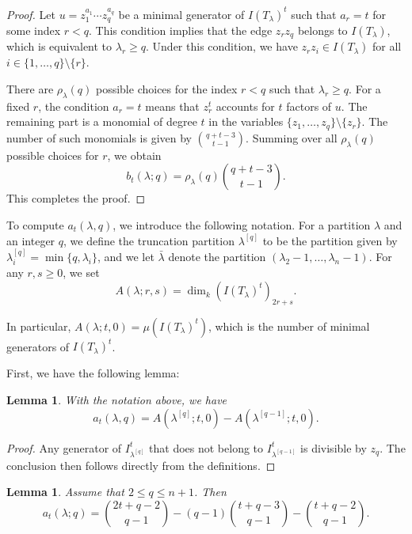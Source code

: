 \documentclass[12pt,amscd]{amsart}
\newtheorem{lem}[thm]{Lemma}
\theoremstyle{definition}
\numberwithin{equation}{section}
\begin{document}
\begin{proof} 
Let $u = z_1^{a_1} \cdots z_q^{a_q}$ be a minimal generator of $I(T_\lambda)^t$ such that $a_r = t$ for some index $r < q$. This condition implies that the edge $z_r z_q$ belongs to $I(T_\lambda)$, which is equivalent to $\lambda_r \ge q$. Under this condition, we have $z_r z_i \in I(T_\lambda)$ for all $i \in \{1, \ldots, q\} \setminus \{r\}$.

There are $\rho_\lambda(q)$ possible choices for the index $r < q$ such that $\lambda_r \ge q$. For a fixed $r$, the condition $a_r = t$ means that $z_r^t$ accounts for $t$ factors of $u$. The remaining part is a monomial of degree $t$ in the variables $\{z_1, \ldots, z_q\} \setminus \{z_r\}$. The number of such monomials is given by $\binom{q + t - 3}{t - 1}$. Summing over all $\rho_\lambda(q)$ possible choices for $r$, we obtain
\[
b_t(\lambda; q) = \rho_\lambda(q) \binom{q + t - 3}{t - 1}.
\]
This completes the proof.
\end{proof}

To compute $a_t(\lambda, q)$, we introduce the following notation. For a partition $\lambda$ and an integer $q$, we define the truncation partition $\lambda^{[q]}$ to be the partition given by $\lambda^{[q]}_i = \min \{q, \lambda_i\}$, and we let $\bar{\lambda}$ denote the partition $(\lambda_2 - 1, \ldots, \lambda_n - 1)$. For any $r, s \ge 0$, we set 
\[
A(\lambda; r, s) = \dim_k (I(T_\lambda)^t)_{2r + s}.
\]

In particular, $A(\lambda; t, 0) = \mu(I (T_\lambda)^t)$, which is the number of minimal generators of $I (T_\lambda)^t$.

First, we have the following lemma:
\begin{lem}\label{lem_a_1} 
With the notation above, we have 
\[
a_t(\lambda, q) = A(\lambda^{[q]}; t, 0) - A(\lambda^{[q-1]}; t, 0).
\]
\end{lem}
\begin{proof}
Any generator of $I_{\lambda^{[q]}}^t$ that does not belong to $I_{\lambda^{[q-1]}}^t$ is divisible by $z_q$. The conclusion then follows directly from the definitions.
\end{proof}

\begin{lem}\label{lem_a_2} 
Assume that $2 \le q \le n+1$. Then 
\[
a_t(\lambda; q) = \binom{2t + q - 2}{q - 1} - (q - 1)\binom{t + q - 3}{q - 1} - \binom{t + q - 2}{q - 1}.
\]
\end{lem}
\end{document}
